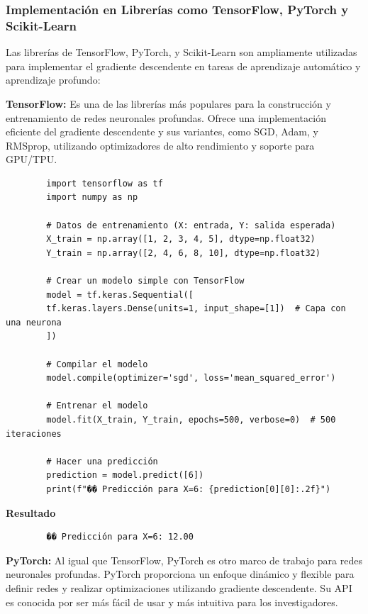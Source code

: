 \documentclass{article}
\begin{document}
	\subsubsection{Implementación en Librerías como TensorFlow, PyTorch y Scikit-Learn}
	
	Las librerías de TensorFlow, PyTorch, y Scikit-Learn son ampliamente utilizadas para implementar el gradiente descendente en tareas de aprendizaje automático y aprendizaje profundo:
	
	\textbf{TensorFlow:} Es una de las librerías más populares para la construcción y entrenamiento de redes neuronales profundas. Ofrece una implementación eficiente del gradiente descendente y sus variantes, como SGD, Adam, y RMSprop, utilizando optimizadores de alto rendimiento y soporte para GPU/TPU.
	
	\begin{verbatim}
		import tensorflow as tf
		import numpy as np
		
		# Datos de entrenamiento (X: entrada, Y: salida esperada)
		X_train = np.array([1, 2, 3, 4, 5], dtype=np.float32)
		Y_train = np.array([2, 4, 6, 8, 10], dtype=np.float32)
		
		# Crear un modelo simple con TensorFlow
		model = tf.keras.Sequential([
		tf.keras.layers.Dense(units=1, input_shape=[1])  # Capa con una neurona
		])
		
		# Compilar el modelo
		model.compile(optimizer='sgd', loss='mean_squared_error')
		
		# Entrenar el modelo
		model.fit(X_train, Y_train, epochs=500, verbose=0)  # 500 iteraciones
		
		# Hacer una predicción
		prediction = model.predict([6])
		print(f"�� Predicción para X=6: {prediction[0][0]:.2f}")
	\end{verbatim}
	
	\textbf{Resultado}
	\begin{verbatim}
		�� Predicción para X=6: 12.00
	\end{verbatim}
	
	\textbf{PyTorch:} Al igual que TensorFlow, PyTorch es otro marco de trabajo para redes neuronales profundas. PyTorch proporciona un enfoque dinámico y flexible para definir redes y realizar optimizaciones utilizando gradiente descendente. Su API es conocida por ser más fácil de usar y más intuitiva para los investigadores.
	
\end{document}
